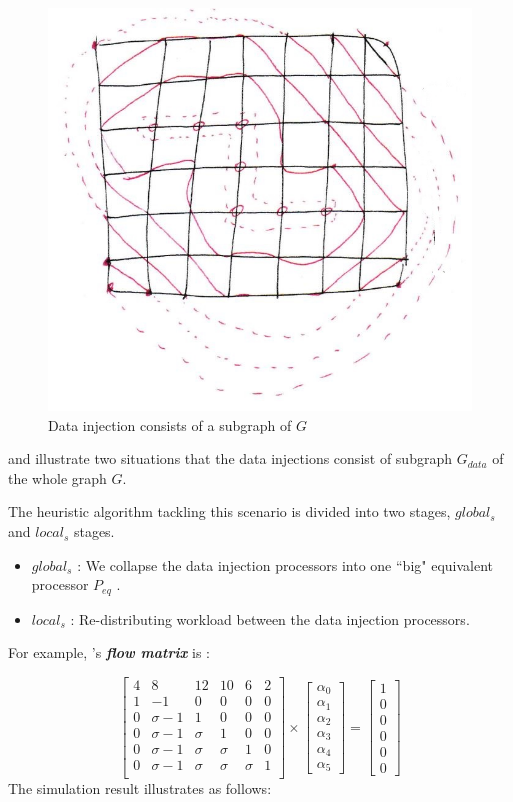 \begin{figure}[!ht]
\centering
\includegraphics[width=0.5\columnwidth]{figure/subgraph2.jpg}
\caption{Data injection consists of a subgraph of $G$}
\label{fig:subgraph2}
\end{figure}
\newpage

 and  illustrate two situations that the data injections consist of subgraph $G_{data}$ of the whole graph $G$. 

The heuristic algorithm tackling this scenario is divided into two stages, $global_{s}$ and $local_{s}$ stages.

\begin{itemize}
\item $global_{s}$ : We collapse the data injection processors into one ``big" equivalent processor $P_{eq}$ \cite{robertazzi1993processor}.
\item $local_{s}$ : Re-distributing workload between the data injection processors.
\end{itemize}

For example, 's \textbf{\textit{flow matrix}} is :

\begin{equation}
{
\left[ \begin{array}{cccccc}
4 & 8 & 12 & 10 & 6 & 2\\
1 & -1 & 0 & 0 & 0 & 0\\
0 & \sigma-1 & 1 & 0 & 0 & 0\\
0 & \sigma-1 & \sigma & 1 & 0 & 0\\
0 & \sigma-1 & \sigma & \sigma & 1 & 0\\
0 & \sigma-1 & \sigma & \sigma & \sigma & 1\\
\end{array} 
\right ]} \times \left[ \begin{array}{c}
\alpha_{0} \\
\alpha_{1} \\
\alpha_{2} \\
\alpha_{3} \\
\alpha_{4} \\
\alpha_{5}
\end{array} 
\right ] = \left[ \begin{array}{c}
1 \\
0 \\
0 \\
0 \\
0 \\
0
\end{array} 
\right ]
\end{equation}
The simulation result illustrates as follows:

